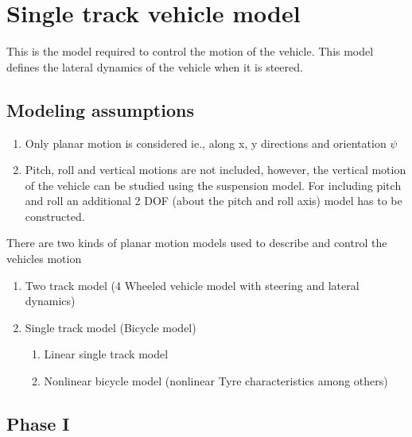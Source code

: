 \section{Single track vehicle model} \label{Sec_2_ch_26_SingleTrackModel}

This is the model required to control the motion of the vehicle. This model defines the lateral dynamics of the vehicle when it is steered. 

\subsection{Modeling assumptions}

\begin{enumerate}
	\item Only planar motion is considered ie., along x, y directions and orientation ${\psi}$
	\item Pitch, roll and vertical motions are not included, however, the vertical motion of the vehicle can be studied using the suspension model. For including pitch and roll an additional 2 DOF (about the pitch and roll axis) model has to be constructed.
\end{enumerate}

There are two kinds of planar motion models used to describe and control the vehicles motion
\begin{enumerate}
	\item Two track model (4 Wheeled vehicle model with steering and lateral dynamics)
	\item Single track model (Bicycle model)
	\begin{enumerate}
		\item Linear single track model
		\item Nonlinear bicycle model (nonlinear Tyre characteristics among others)
	\end{enumerate}
\end{enumerate}

\subsection{Phase I}

